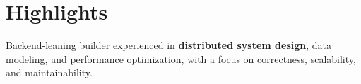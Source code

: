 \section{Highlights}

\begin{onecolentry}
    \begin{highlightsforbulletentries}

    \item Backend-leaning builder experienced in \textbf{distributed system design}, data modeling, and performance optimization, with a focus on correctness, scalability, and maintainability.


    \end{highlightsforbulletentries}
\end{onecolentry}